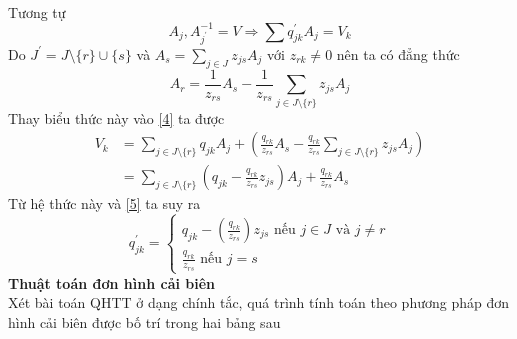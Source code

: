 \documentclass{article}
\begin{document}
\begin{enumerate}
\begin{equation}
\begin{split}
                                    \end{split}
                                \end{equation}
                            Tương tự
                            \begin{equation} \label{5}
                                A_j,A_{j^{'}}^{-1}=V \Rightarrow \sum q_{jk}^{'}A_j=V_k
                            \end{equation}  
                            Do $J^{'}=J \setminus \{r\} \cup \{s\}$ và $A_s=\sum_{j \in J}z_{js}A_j$ với $z_{rk}\neq 0$ nên ta có đẳng thức \\
                            $$A_r=\frac{1}{z_{rs}}A_s - \frac{1}{z_{rs}} \sum_{j \in J \setminus \{r\}}z_{js}A_j$$  
                            Thay biểu thức này vào \eqref{4} ta được
                                \begin{equation}
                                    \begin{split}
                                        V_k&=\sum_{j \in J \setminus \{r\}}q_{jk}A_j+(\frac{q_{rk}}{z_{rs}}A_s-\frac{q_{rk}}{z_{rs}}\sum_{j \in J \setminus \{r\}}z_{js}A_j) \\
                                        &=\sum_{j \in J \setminus \{r\}}(q_{jk}-\frac{q_{rk}}{z_{rs}}z_{js})A_j + \frac{q_{rk}}{z_{rs}}A_s
                                    \end{split}
                                \end{equation}
                            Từ hệ thức này và \eqref{5} ta suy ra
                            \begin{equation} \label{6da}
                                q_{jk}^{'}=
                                \begin{cases}
                                    q_{jk}-(\frac{q_{rk}}{z_{rs}})z_{js} \text{ nếu } j \in J \text{ và } j \neq r \\
                                    \frac{q_{rk}}{z_{rs}} \text{ nếu } j = s
                                \end{cases}
                            \end{equation}     
                        \textbf{Thuật toán đơn hình cải biên} \\
                        Xét bài toán QHTT ở dạng chính tắc, quá trình tính toán theo phương pháp đơn hình cải biên được bố trí trong hai bảng sau \\
                            \begin{figure}

\end{figure}
\end{enumerate}
\end{document}
